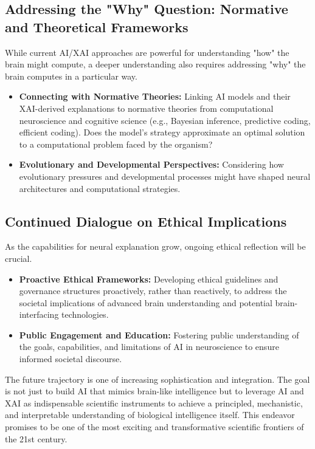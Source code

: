 \documentclass[11pt,a4paper]{article}
\begin{document}
\subsection{Addressing the "Why" Question: Normative and Theoretical Frameworks}
While current AI/XAI approaches are powerful for understanding "how" the brain might compute, a deeper understanding also requires addressing "why" the brain computes in a particular way.
\begin{itemize}
    \item \textbf{Connecting with Normative Theories:} Linking AI models and their XAI-derived explanations to normative theories from computational neuroscience and cognitive science (e.g., Bayesian inference, predictive coding, efficient coding). Does the model's strategy approximate an optimal solution to a computational problem faced by the organism?
    \item \textbf{Evolutionary and Developmental Perspectives:} Considering how evolutionary pressures and developmental processes might have shaped neural architectures and computational strategies.
\end{itemize}

\subsection{Continued Dialogue on Ethical Implications}
As the capabilities for neural explanation grow, ongoing ethical reflection will be crucial.
\begin{itemize}
    \item \textbf{Proactive Ethical Frameworks:} Developing ethical guidelines and governance structures proactively, rather than reactively, to address the societal implications of advanced brain understanding and potential brain-interfacing technologies.
    \item \textbf{Public Engagement and Education:} Fostering public understanding of the goals, capabilities, and limitations of AI in neuroscience to ensure informed societal discourse.
\end{itemize}
The future trajectory is one of increasing sophistication and integration. The goal is not just to build AI that mimics brain-like intelligence but to leverage AI and XAI as indispensable scientific instruments to achieve a principled, mechanistic, and interpretable understanding of biological intelligence itself. This endeavor promises to be one of the most exciting and transformative scientific frontiers of the 21st century.
\end{document}
